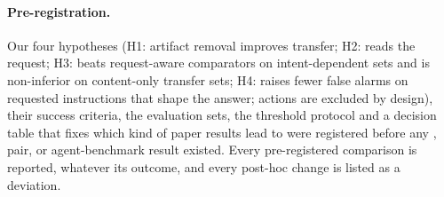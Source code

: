 \paragraph{Pre-registration.}
Our four hypotheses (H1: artifact removal improves transfer; H2: \ict{} reads the request; H3: \ict{} beats
request-aware comparators on intent-dependent sets and is non-inferior on content-only transfer sets; H4: \ict{}
raises fewer false alarms on requested instructions that shape the answer; actions are excluded by design), their success criteria, the evaluation sets, the threshold
protocol and a decision table that fixes which kind of paper results lead to were registered before any \vthree{},
pair, or agent-benchmark result existed. Every pre-registered comparison is reported, whatever its outcome, and every
post-hoc change is listed as a deviation. 
